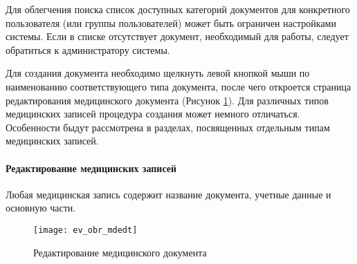 {%


\begin{prim}
 Для облегчения поиска список доступных категорий документов для конкретного пользователя (или группы пользователей) может быть ограничен настройками системы. Если в списке отсутствует документ, необходимый для работы, следует обратиться к администратору системы.
\end{prim} 

Для создания документа необходимо щелкнуть левой кнопкой мыши по наименованию соответствующего типа документа, после чего откроется страница редактирования медицинского документа (Рисунок \ref{img_ev_obr_mdedt}). Для различных типов медицинских записей процедура создания может немного отличаться. Особенности быдут рассмотрена в разделах, посвященных отдельным типам медицинских записей.

\paragraph{Редактирование медицинских записей} \label{ev_obr_mdedt}

Любая медицинская запись содержит название документа, учетные данные и основную части.

\begin{figure}[ht]\centering
 \texttt{[image: ev\_obr\_mdedt]}
 \caption{Редактирование медицинского документа}
 \label{img_ev_obr_mdedt}
\end{figure}

}
